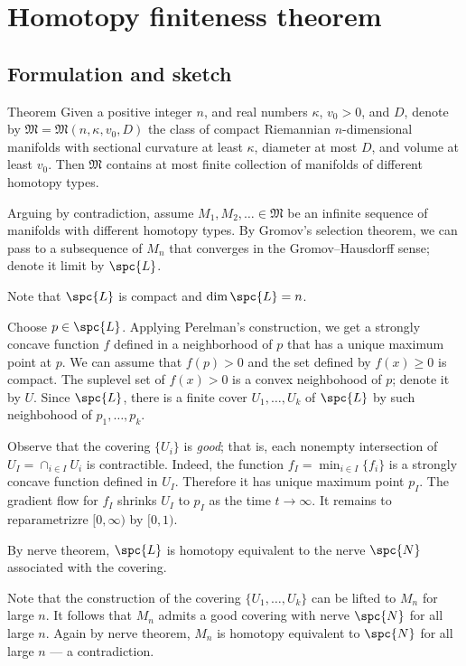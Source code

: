 \chapter{Homotopy finiteness theorem}

\section{Formulation and sketch}

\begin{thm}{Theorem}
Given a positive integer $n$, and real numbers $\kappa$, $v_0>0$, and $D$,
denote by $\mathfrak{M}=\mathfrak{M}(n,\kappa,v_0,D)$ the class of compact Riemannian $n$-dimensional manifolds
with sectional curvature at least $\kappa$,
diameter at most $D$,
and volume at least $v_0$.
Then $\mathfrak{M}$ contains at most finite collection of manifolds of different homotopy types.
\end{thm}

Arguing by contradiction, assume $M_1,M_2,\dots\in \mathfrak{M}$ be an infinite sequence of manifolds with different homotopy types.
By Gromov's selection theorem, we can pass to a subsequence of $M_n$ that converges in the Gromov--Hausdorff sense; denote it limit by $\spc{L}$.

Note that $\spc{L}$ is compact and $\dim\spc{L}=n$.

Choose $p\in \spc{L}$.
Applying Perelman's construction, we get a strongly concave function $f$ defined in a neighborhood of $p$ that has a unique maximum point at $p$.
We can assume that $f(p)>0$ and the set defined by $f(x)\ge 0$ is compact.
The suplevel set of $f(x)>0$ is a convex neighbohood of $p$; denote it by $U$.
Since $\spc{L}$, there is a finite cover $U_1,\dots, U_k$ of $\spc{L}$ by such neighbohood of $p_1,\dots,p_k$.

Observe that the covering $\{U_i\}$ is \emph{good};
that is, each nonempty intersection of $U_I=\cap_{i\in I} U_i$ is contractible.
Indeed, the function $f_I=\min_{i\in I}\{f_i\}$ is a strongly concave function defined in $U_I$.
Therefore it has unique maximum point $p_I$.
The gradient flow for $f_I$ shrinks $U_I$ to $p_I$ as the time $t\to\infty$.
It remains to reparametrizre $[0,\infty)$ by $[0,1)$.

By nerve theorem, $\spc{L}$ is homotopy equivalent to the nerve $\spc{N}$ associated with the covering.

Note that the construction of the covering $\{U_1,\dots, U_k\}$ can be lifted to $M_n$ for large $n$.
It follows that $M_n$ admits a good covering with nerve $\spc{N}$ for all large $n$.
Again by nerve theorem, $M_n$ is homotopy equivalent to $\spc{N}$ for all large $n$ --- a contradiction.
\qeds
